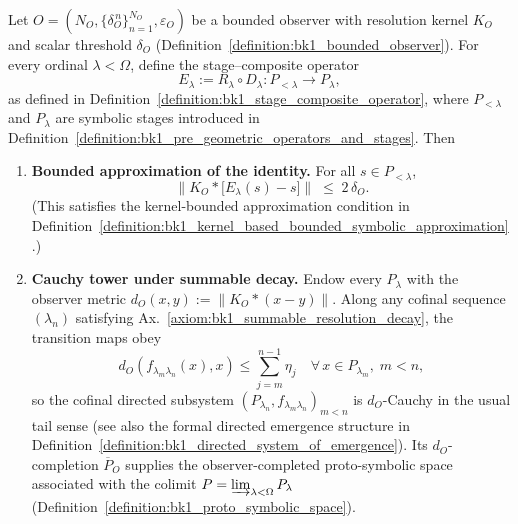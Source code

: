 \begin{lemma}
\label{lemma:bk1_observer_bounded_emergence_constraint}
Let 
\(
O=(N_O,\{\delta^{\,n}_{O}\}_{n=1}^{N_O},\varepsilon_O)
\)
be a bounded observer with resolution kernel \(K_O\) and scalar threshold \(\delta_O\) (Definition~\ref{definition:bk1_bounded_observer}).  
For every ordinal \(\lambda<\Omega\), define the stage--composite operator
\[
  E_\lambda := R_\lambda \circ D_\lambda : P_{<\lambda} \longrightarrow P_\lambda,
\]
as defined in Definition~\ref{definition:bk1_stage_composite_operator},  
where \(P_{<\lambda}\) and \(P_\lambda\) are symbolic stages introduced in Definition~\ref{definition:bk1_pre_geometric_operators_and_stages}.  
Then
\begin{enumerate}
  \item[\textup{(i)}]  \textbf{Bounded approximation of the identity.}\; 
        For all \(s\in P_{<\lambda}\),
        \begin{equation}
          \bigl\lVert K_O * \bigl[E_\lambda(s) - s\bigr] \bigr\rVert 
          \;\le\; 2\,\delta_O.
        \end{equation}
        (This satisfies the kernel-bounded approximation condition in Definition~\ref{definition:bk1_kernel_based_bounded_symbolic_approximation}.)

  \item[\textup{(ii)}]  \textbf{Cauchy tower under summable decay.}\;
        Endow every \(P_\lambda\) with the observer metric
        \(
          d_O(x,y) := \lVert K_O * (x - y) \rVert.
        \)
        Along any cofinal sequence \((\lambda_n)\) satisfying
        Ax.~\ref{axiom:bk1_summable_resolution_decay}, the transition maps obey
        \[
          d_O(f_{\lambda_m\lambda_n}(x),x)
          \leq \sum_{j=m}^{n-1}\eta_j
          \quad
          \forall\,x \in P_{\lambda_m},\;
          m<n,
        \]
        so the cofinal directed subsystem
        \(
          (P_{\lambda_n}, f_{\lambda_m\lambda_n})_{m<n}
        \)
        is \(d_O\)-Cauchy in the usual tail sense
        (see also the formal directed emergence structure in Definition~\ref{definition:bk1_directed_system_of_emergence}). Its \(d_O\)-completion
        \(
          \overline{P}_O
        \)
        supplies the observer-completed proto-symbolic space associated with
        the colimit \(P=\varinjlim_{\lambda<\Omega}P_\lambda\)
        (Definition~\ref{definition:bk1_proto_symbolic_space}).
\end{enumerate}
\end{lemma}
